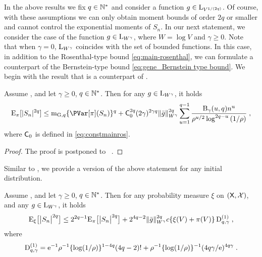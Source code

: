 \documentclass[sn-mathphys,Numbered]{sn-jnl}%
\begin{document}
In the above results we fix $q \in \nsets$ and consider a function $g \in \mrl_{V^{1/(2q)}}$. Of course, with these assumptions we can only obtain moment bounds of order $2q$ or smaller and cannot control the exponential moments of $S_n$. In our next statement, we consider the case of the function $g \in \mrl_{W^{\gamma}}$, where $W = \log V$ and $\gamma \geq 0$. Note that when $\gamma = 0$, $\mrl_{W^{\gamma}}$ coincides with the set of bounded functions. In this case, in addition to the Rosenthal-type bound \eqref{eq:main-rosenthal}, we can formulate a counterpart of the Bernstein-type bound \eqref{eq:gene_Bernstein type bound}. We begin with the result that is a counterpart of .
\begin{theorem}\label{th:rosenthal_log_V}
Assume ,  and let $\gamma \geq 0$, $q \in \nset^*$. Then for any $g \in \mrl_{W^\gamma}$, it holds
\begin{equation*}
\PE_{\pi}[|S_n|^{2q}] \leq \momentGq[q] \{\PVar[\pi](S_n)\}^q+  \Constmainros^{2q} (2\gamma)^{2\gamma q} \Vnorm[W^\gamma]{\bar{g}}^{2q} \sum_{u=1}^{q-1}  \frac{\ConstB_{\gamma}(u,q) n^{u}}{\ratev^{u/2} \log^{2q-u}{(1/\ratev)}}\eqsp,
\end{equation*}
where $\Constmainros$ is defined in \eqref{eq:constmainros}.
\end{theorem}
\begin{proof}
The proof is postponed to ~.
\end{proof}
Similar to , we provide a version of the above statement for any initial distribution.
\begin{theorem}
\label{theo:changeofmeasure-1}
Assume ,  and let $\gamma \geq 0$,  $q \in \nset^*$. Then for any probability measure $\xi$ on $(\Xset,\Xsigma)$, and any $g \in \mrl_{W^\gamma}$, it holds
\begin{equation}
     \PE_\xi\big[ \big|S_n \big|^{2q} \big] \leq 2^{2q-1} \PE_\pi\big[ \big|S_n \big|^{2q} \big]  + 2^{4q-2} \Vnorm[W^\gamma]{\bar{g}}^{2q} \cmconstv \{ \xi(V) + \pi(V) \} \operatorname{D}^{(1)}_{q,\gamma}\eqsp,
\end{equation}
where
\begin{equation}
\operatorname{D}^{(1)}_{q,\gamma}= \rme^{-1} \ratev^{-1} \{ \log(1/\ratev) \}^{1- 4 q} (4q-2) ! +  \ratev^{-1} \{ \log(1/\ratev) \}^{-1} (4 q \gamma/ \rme)^{4 q \gamma}\eqsp.
\end{equation}
\end{theorem}
\end{document}
